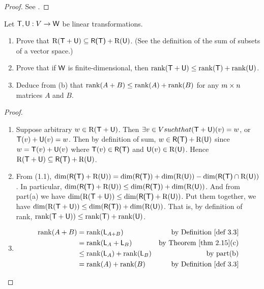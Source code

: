 \begin{proof}
See .
\end{proof}

\begin{exercise} \label{exercise 3.2.14}
Let \(\textsf{T}, \textsf{U}: V \to \textsf{W}\) be linear transformations.
\begin{enumerate}
\item Prove that \(\mathrm{R}(\textsf{T} + \textsf{U}) \subseteq \textsf{R(T)} + \mathrm{R}(\textsf{U})\).
(See the definition  of the sum of subsets of a vector space.)
\item Prove that if \(\textsf{W}\) is finite-dimensional, then \(\mathrm{rank}(\textsf{T} + \textsf{U}) \le \mathrm{rank}(\textsf{T}) + \mathrm{rank}(\textsf{U})\).
\item Deduce from (b) that \(\mathrm{rank}(A + B) \le \mathrm{rank}(A) + \mathrm{rank}(B)\) for any \(m \times n\) matrices \(A\) and \(B\).
\end{enumerate}
\end{exercise}

\begin{proof} \ 

\begin{enumerate}
\item Suppose arbitrary \(w \in \mathrm{R}(\textsf{T} + \textsf{U})\).
Then \(\exists v \in V such that (\textsf{T} + \textsf{U})(v) = w\), or \(\textsf{T}(v) + \textsf{U}(v) = w\).
Then by definition of sum, \(w \in \textsf{R(T)} + \mathrm{R}(\textsf{U})\) since \(w = \textsf{T}(v) + \textsf{U}(v)\) where \(\textsf{T}(v) \in \textsf{R(T)}\) and \(\textsf{U}(v) \in \mathrm{R}(\textsf{U})\).
Hence \(\mathrm{R}(\textsf{T} + \textsf{U}) \subseteq \textsf{R(T)} + \mathrm{R}(\textsf{U})\).

\sloppy
\item From (1.1), \(\dim(\textsf{R(T)} + \mathrm{R}(\textsf{U})) = \dim(\textsf{R(T)}) + \dim(\mathrm{R}(\textsf{U})) - \dim(\textsf{R(T)} \cap \mathrm{R}(\textsf{U}))\).
In particular, \(\dim(\textsf{R(T)} + \mathrm{R}(\textsf{U})) \le \dim(\textsf{R(T)}) + \dim(\mathrm{R}(\textsf{U}))\).
And from part(a) we have \(\dim(\mathrm{R}(\textsf{T} + \textsf{U})) \le \dim(\textsf{R(T)} + \mathrm{R}(\textsf{U}))\).
Put them together, we have \(\dim(\mathrm{R}(\textsf{T} + \textsf{U})) \le \dim(\textsf{R(T)}) + \dim(\mathrm{R}(\textsf{U}))\).
That is, by definition of rank, \(\mathrm{rank}(\textsf{T} + \textsf{U})) \le \mathrm{rank}(\textsf{T}) + \mathrm{rank}(\textsf{U})\).

\item
\begin{align*}
    \rank(A + B) & = \rank(\LMTRAN_{A + B}) & \text{by \DEF{3.3}} \\
                 & = \rank(\LMTRAN_A + \LMTRAN_B) & \text{by \THM{2.15}(c)} \\
                 & \le \rank(\LMTRAN_A) + \rank(\LMTRAN_B) & \text{by part(b)} \\
                 & = \rank(A) + \rank(B) & \text{by \DEF{3.3}}
\end{align*}
\end{enumerate}
\end{proof}

